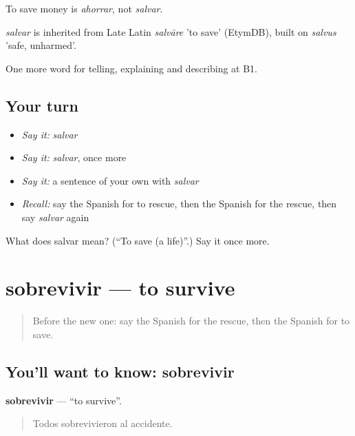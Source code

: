 To save money is \emph{ahorrar}, not \emph{salvar}.

\begin{cousinweb}
\emph{salvar} is inherited from Late Latin \emph{salvāre} 'to save' (EtymDB), built on \emph{salvus} 'safe, unharmed'.
\end{cousinweb}

\begin{grammarlens}[title={What you've built}]
One more word for telling, explaining and describing at B1.
\end{grammarlens}

\subsection*{Your turn}
\begin{itemize}
\raggedright
  \item \emph{Say it:} \emph{salvar}
  \item \emph{Say it:} \emph{salvar}, once more
  \item \emph{Say it:} a sentence of your own with \emph{salvar}
  \item \emph{Recall:} say the Spanish for to rescue, then the Spanish for the rescue, then say \emph{salvar} again
\end{itemize}

\begin{tcolorbox}[breakable,colback=teal!4,colframe=teal!35!black,title={Before you move on}]
What does salvar mean? (\textquotedblleft{}To save (a life)\textquotedblright{}.) Say it once more.
\end{tcolorbox}
\section[sobrevivir]{sobrevivir — to survive}

\label{lesson:ES-C526-sobrevivir}



\begin{quote}
Before the new one: say the Spanish for the rescue, then the Spanish for to save.
\end{quote}

\subsection*{You'll want to know: sobrevivir}
\textbf{sobrevivir} — \textquotedblleft{}to survive\textquotedblright{}.

\begin{quote}
Todos sobrevivieron al accidente.
\end{quote}

